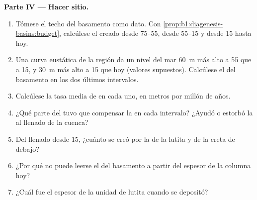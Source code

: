 \begin{problem}
\noindent\textbf{Parte IV --- Hacer sitio.}
\begin{enumerate}[resume]
  \item Tómese el techo del basamento como dato. Con \cref{prop:b1:diagenesis-basins:budget}, calcúlese el  creado desde \qtyrange{75}{55}{\Ma}, desde \qtyrange{55}{15}{\Ma} y desde \qty{15}{\Ma} hasta hoy.
  \item Una curva eustática de la región da un nivel del mar \qty{60}{m} más alto a \qty{55}{\Ma} que a \qty{15}{\Ma}, y \qty{30}{m} más alto a \qty{15}{\Ma} que hoy (valores supuestos). Calcúlese el
         del basamento en los dos últimos intervalos.
  \item Calcúlese la tasa media de  en cada uno, en metros por millón de años.
  \item ¿Qué parte del  tuvo que compensar la  en cada intervalo? ¿Ayudó o estorbó la  al llenado de la cuenca?
  \item Del  llenado desde \qty{15}{\Ma}, ¿cuánto se creó por la  de la lutita y de la creta de debajo?
  \item ¿Por qué no puede leerse el  del basamento a partir del espesor de la columna hoy?
  \item ¿Cuál fue el espesor de la unidad de lutita cuando se depositó?
\end{enumerate}
\end{problem}
